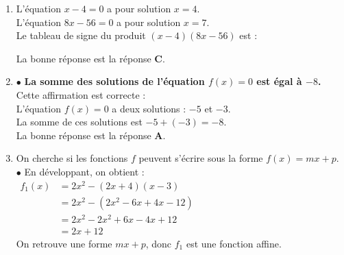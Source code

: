 \documentclass[a4paper,11pt]{article}
\begin{document}
\begin{seance}{}
\begin{enumerate}
\begin{minipage}[c]{0.4\textwidth}
\begin{tikzpicture}[baseline,scale=0.7]
\end{tikzpicture}
\end{minipage} 
            Comme la fonction racine carrée est définie sur $[0\,;\,+\infty[$, l'ensemble des solutions de l'inéquation $(I)$ est : {\bfseries \color[HTML]{F15929}$S = [0\,;\,9]$}.\\La bonne réponse est la réponse {\bfseries \color[HTML]{F15929}D}.

\item L'équation $x-4=0$ a pour solution $x=4$.\\
  L'équation $8x-56=0$ a pour solution $x=7$.\\
  Le tableau de signe du produit $(x-4)(8x-56)$ est : \\


La bonne réponse est la réponse {\bfseries \color[HTML]{F15929}C}.

\item $\bullet$ {\bfseries \color[HTML]{F15929}La somme des solutions de l'équation $f(x)=0$ est égal à $-8$.}\\  Cette affirmation est correcte : \\L'équation $f(x)=0$ a deux solutions : $-5$ et $-3$.\\
          La somme de ces solutions est $-5+ (-3)= -8$.\\
La bonne réponse est la réponse {\bfseries \color[HTML]{F15929}A}.

\item On cherche si les fonctions $f$ peuvent s'écrire sous la forme $f(x)=mx+p$.\\ $\bullet$ En développant, on obtient :\\ 
        $\begin{aligned}
        f_1(x)&=2x^2-(2x+4)(x-3)\\
        &=2x^2-(2x^2-6x+4x-12)\\
        &=2x^2-2x^2+6x-4x+12\\
        &=2x+12
        \end{aligned}$\\
        On retrouve une forme $mx+p$, donc $f_1$ est une fonction affine.\\
        

\end{enumerate}
\end{seance}
\end{document}
